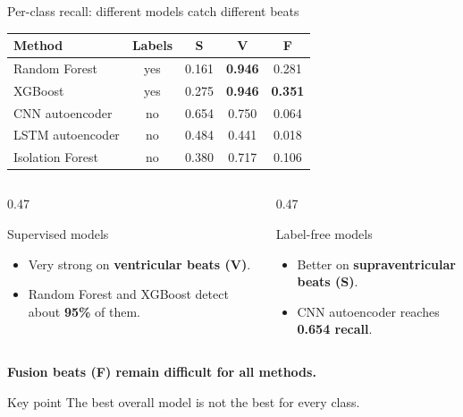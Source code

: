 \documentclass[aspectratio=169,10pt]{beamer}
\newcommand{\good}[1]{\textbf{#1}}
\newcommand{\keypoint}[1]{%
  \vspace{0.4em}
  \begin{alertblock}{Key point}
    #1
  \end{alertblock}
}
\begin{document}
\begin{frame}{Per-class recall: different models catch different beats}

\centering

\small
\begin{tabular}{lcccc}
  \toprule
  Method & Labels & S & V & F \\
  \midrule
  Random Forest    & yes & 0.161 & \good{0.946} & 0.281 \\
  XGBoost          & yes & 0.275 & \good{0.946} & \good{0.351} \\
  CNN autoencoder  & no  & \alert{0.654} & 0.750 & 0.064 \\
  LSTM autoencoder & no  & 0.484 & 0.441 & 0.018 \\
  Isolation Forest & no  & 0.380 & 0.717 & 0.106 \\
  \bottomrule
\end{tabular}

\vspace{1em}

\begin{columns}[T,onlytextwidth]

  \begin{column}{0.47\textwidth}
    \begin{block}{Supervised models}
      \begin{itemize}
        \item Very strong on \textbf{ventricular beats (V)}.
        \item Random Forest and XGBoost detect about \textbf{95\%} of them.
      \end{itemize}
    \end{block}
  \end{column}

  \begin{column}{0.47\textwidth}
    \begin{block}{Label-free models}
      \begin{itemize}
        \item Better on \textbf{supraventricular beats (S)}.
        \item CNN autoencoder reaches \textbf{0.654 recall}.
      \end{itemize}
    \end{block}
  \end{column}

\end{columns}

\vspace{0.6em}

\centering
\textbf{Fusion beats (F) remain difficult for all methods.}

\vfill

\keypoint{The best overall model is not the best for every class.}

\end{frame}
\end{document}
